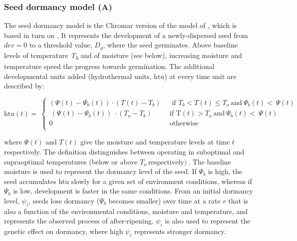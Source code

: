 \documentclass[phd]{infthesis}
\begin{document}
\subsubsection{Seed dormancy model (A)}
\label{seed-dormancy-model-a}

The seed dormancy model is the Chromar version of the model of
\citet{burghardt_modeling_2015}, which is based in turn on
\citet{alvarado_hydrothermal_2002}. It represents the development of a
newly-dispersed seed from \(dev = 0\) to a threshold value, \(D_{g}\), where the
seed germinates. Above baseline levels of temperature \emph{T\textsubscript{b}}
and of moisture (see below), increasing moisture and temperature speed the
progress towards germination. The additional developmental units added
(hydrothermal units, \(\text{htu}\)) at every time unit are described by:

\[\text{htu}\left( t \right) = \ \left\{ \begin{matrix}
\left( \Psi\left( t \right) - \Psi_{b}\left( t \right) \right) \cdot \left( T\left( t \right) - T_{b} \right) \\
\ \left( \Psi\left( t \right) - \Psi_{b}\left( t \right) \right)\  \cdot \left( T_{o} - T_{b} \right) \\
0 \\
\end{matrix} \right.\ \ \begin{matrix}
\text{\ \ if\ \ }T_{b} < T\left( t \right) \leq T_{o}\ \text{and}\ \Psi_{b}\left( t \right) < \ \Psi(t) \\
\text{if\ \ T}\left( t \right) > T_{o}\ \text{and}\ \Psi_{b}\left( t \right) < \ \Psi\left( t \right) \\
\text{otherwise} \\
\end{matrix}\]

where \(\Psi(t)\) and \(T(t)\) give the moisture and temperature levels
at time \(t\) respectively. The definition distinguishes between
operating in suboptimal and supraoptimal temperatures (below or above
\(T_{o}\ \text{respectively})\ \). The baseline moisture is used to
represent the dormancy level of the seed. If \(\Psi_{b}\) is high, the
seed accumulates htu slowly for a given set of environment conditions,
whereas if \(\Psi_{b}\) is low, development is faster in the same
conditions. From an initial dormancy level, \(\psi_{i}\), seeds lose
dormancy (\(\Psi_{b}\) becomes smaller) over time at a rate $r$
that is also a function of the environmental conditions, moisture and
temperature, and represents the observed process of after-ripening.
\(\psi_{i}\) is also used to represent the genetic effect on dormancy,
where high \(\psi_{i}\) represents stronger dormancy.
\end{document}
